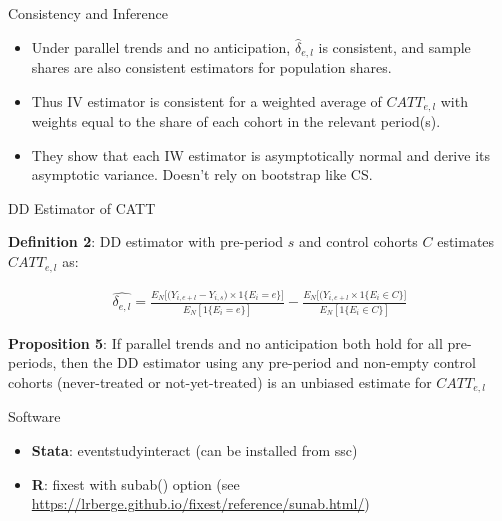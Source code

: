 \documentclass{beamer}
\begin{document}
\begin{frame}{Consistency and Inference}


\begin{itemize}
\item Under parallel trends and no anticipation, $\widehat{\delta}_{e,l}$ is consistent, and sample shares are also consistent estimators for population shares. 
\item Thus IV estimator is consistent for a weighted average of $CATT_{e,l}$ with weights equal to the share of each cohort in the relevant period(s).
\item They show that each IW estimator is asymptotically normal and derive its asymptotic variance. Doesn't rely on bootstrap like CS.
\end{itemize}

\end{frame}

\begin{frame}{DD Estimator of CATT}

\textbf{Definition 2}: DD estimator with pre-period $s$ and control cohorts $C$ estimates $CATT_{e,l}$ as:

\begin{eqnarray*}
\widehat{\delta_{e,l}} = \frac{ E_N \big [ \big ( Y_{i, e+l} - Y_{i,s} \big ) \times 1\{E_i=e\} \big ]}{E_N[1 \{E_i=e\} ]} - \frac{E_N \big [ \big ( Y_{i,e+l} \times 1 \{E_i \in C \} ]}{E_N [1 \{ E_i \in C \}]}
\end{eqnarray*}


\textbf{Proposition 5}: If parallel trends and no anticipation both hold for all pre-periods, then the DD estimator using any pre-period and non-empty control cohorts (never-treated or not-yet-treated) is an unbiased estimate for $CATT_{e,l}$

\end{frame}

\begin{frame}{Software}

\begin{itemize}
\item \textbf{Stata}: eventstudyinteract (can be installed from ssc)
\item \textbf{R}: fixest with subab() option (see \url{https://lrberge.github.io/fixest/reference/sunab.html/})
\end{itemize}


\end{frame}
\end{document}
